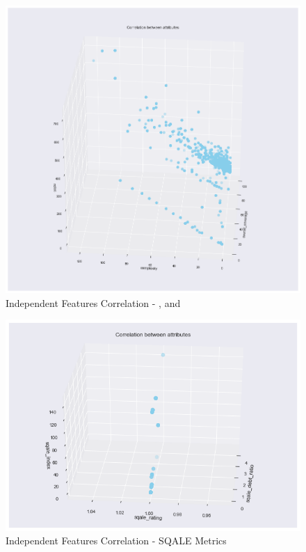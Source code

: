 \begin{figure}
    \centering
    \includegraphics[scale=0.5]{Figures/independent-feat-trends/Correlation_between_attributes_overall_coverage_complexity_ncloc.png}
    \caption{Independent Features Correlation - \overallCoverage{}, \complexity{} and \ncloc{}}
    \label{fig:corr:post-transformation:overallCoverage-complaxity-ncloc}
\end{figure}

\begin{figure}
    \centering
    \includegraphics[scale=0.7]{Figures/independent-feat-trends/Correlation_between_attributes_sqale_debt_ratio_sqale_rating_sqale_index.png}
    \caption{Independent Features Correlation - SQALE Metrics}
    \label{fig:corr:post-transformation:sqale}
\end{figure}
\FloatBarrier